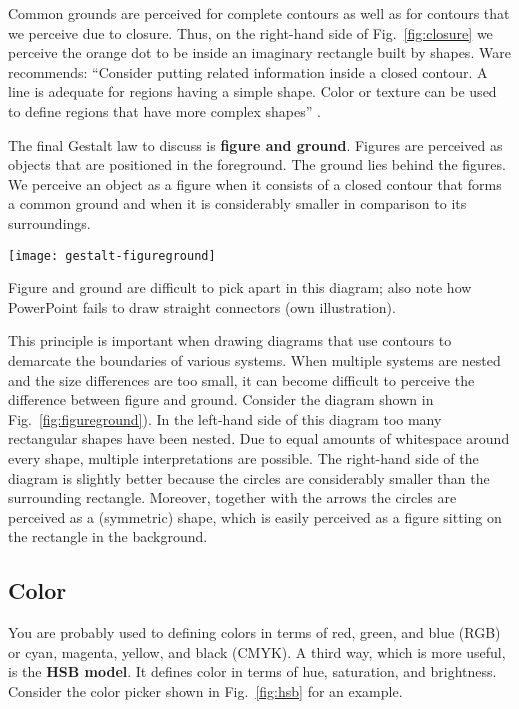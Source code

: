 Common grounds are perceived for complete contours as well as for contours that we perceive due to closure. Thus, on the right-hand side of Fig.~\ref{fig:closure} we perceive the orange dot to be inside an imaginary rectangle built by shapes. Ware recommends: ``Consider putting related information inside a closed contour. A line is adequate for regions having a simple shape. Color or texture can be used to define regions that have more complex shapes'' \cite{Ware12}.

The final Gestalt law to discuss is \textbf{figure and ground}. Figures are perceived as objects that are positioned in the foreground. The ground lies behind the figures. We perceive an object as a figure when it consists of a closed contour that forms a common ground and when it is considerably smaller in comparison to its surroundings.

\begin{marginfigure}
\centering
\texttt{[image: gestalt-figureground]}
\caption{\label{fig:figureground} Figure and ground are difficult to pick apart in this diagram; also note how PowerPoint fails to draw straight connectors (own illustration).}%
\end{marginfigure}

This principle is important when drawing diagrams that use contours to demarcate the boundaries of various systems. When multiple systems are nested and the size differences are too small, it can become difficult to perceive the difference between figure and ground. Consider the diagram shown in Fig.~\ref{fig:figureground}). In the left-hand side of this diagram too many rectangular shapes have been nested. Due to equal amounts of whitespace around every shape, multiple interpretations are possible. The right-hand side of the diagram is slightly better because the circles are considerably smaller than the surrounding rectangle. Moreover, together with the arrows the circles are perceived as a (symmetric) shape, which is easily perceived as a figure sitting on the rectangle in the background.




\subsection{Color}
\label{sec:color}

You are probably used to defining colors in terms of red, green, and blue (RGB) or cyan, magenta, yellow, and black (CMYK). A third way, which is more useful, is the \textbf{HSB model}. It defines color in terms of hue, saturation, and brightness. Consider the color picker shown in Fig.~\ref{fig:hsb} for an example.

